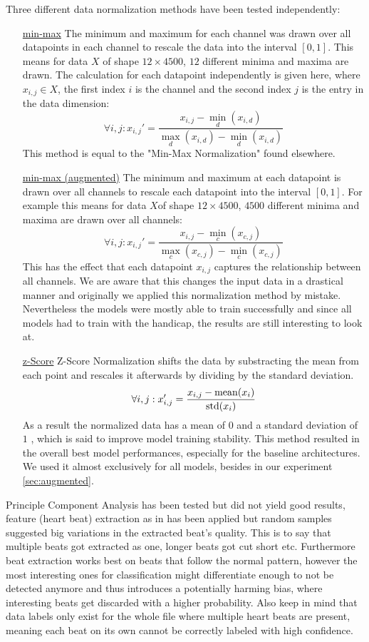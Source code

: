 Three different data normalization methods have been tested independently: 
\begin{itemize}
	\item[\underline{min-max}] The minimum and maximum for each channel was drawn over all datapoints in each channel to rescale the data into the interval $[0, 1]$. This means for data $X$ of shape $12 \times 4500$, $12$ different minima and maxima are drawn. The calculation for each datapoint independently is given here, where $x_{i,j} \in X$, the first index $i$ is the channel and the second index $j$ is the entry in the data dimension: $$\forall i,j: x_{i, j}'=\frac{x_{i, j}-\min\limits_{d}(x_{i, d})}{\max\limits_{d}(x_{i, d})-\min\limits_{d}(x_{i, d})}$$ This method is equal to the "Min-Max Normalization" found elsewhere. 
	\item[\underline{min-max (augmented)}] The minimum and maximum at each datapoint is drawn over all channels to rescale each datapoint into the interval $[0, 1]$. For example this means for data $X$of shape $12 \times 4500$, $4500$ different minima and maxima are drawn over all channels: $$\forall i,j: x_{i, j}'=\frac{x_{i, j}-\min\limits_{c}(x_{c, j})}{\max\limits_{c}(x_{c, j})-\min\limits_{c}(x_{c, j})}$$ This has the effect that each datapoint $x_{i,j}$ captures the relationship between all channels. We are aware that this changes the input data in a drastical manner and originally we applied this normalization method by mistake. Nevertheless the models were mostly able to train successfully and since all models had to train with the handicap, the results are still interesting to look at.
	\item[\underline{z-Score}] Z-Score Normalization shifts the data by substracting the mean from each point and rescales it afterwards by dividing by the standard deviation. $$\forall i,j: x_{i, j}'=\frac{x_{i, j}-\operatorname*{mean}(x_{i})}{\operatorname*{std}(x_i)}$$ As a result the normalized data has a mean of $0$ and a standard deviation of $1$ , which is said to improve model training stability. This method resulted in the overall best model performances, especially for the baseline architectures. We used it almost exclusively for all models, besides in our experiment \autoref{sec:augmented}.
\end{itemize}
Principle Component Analysis has been tested but did not yield good results, feature (heart beat) extraction as in \autocite{beat_classification} has been applied but random samples suggested big variations in the extracted beat's quality. This is to say that multiple beats got extracted as one, longer beats got cut short etc. Furthermore beat extraction works best on beats that follow the normal pattern, however the most interesting ones for classification might differentiate enough to not be detected anymore and thus introduces a potentially harming bias, where interesting beats get discarded with a higher probability. Also keep in mind that data labels only exist for the whole file where multiple heart beats are present, meaning each beat on its own cannot be correctly labeled with high confidence.

